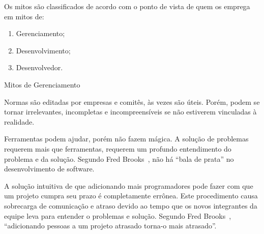 \begin{frame}{\inserttitle}

Os mitos são classificados de acordo com o ponto de vista de quem 
os emprega em mitos de:

  \begin{enumerate}[<+-| alert@+>]
  \item Gerenciamento;
  \item Desenvolvimento;
  \item Desenvolvedor.
  \end{enumerate}

\end{frame}


\begin{frame}{Mitos de Gerenciamento}
\small
\begin{description}[<+-| alert@+>]
\item[Normas e padrões] Normas são editadas por empresas e comitês, às
  vezes são úteis. Porém, podem se tornar irrelevantes, incompletas e
  incompreensíveis se não estiverem vinculadas à realidade.
\item[Ferramentas] Ferramentas podem ajudar, porém não fazem mágica. A
  solução de problemas requerem mais que ferramentas, requerem um
  profundo entendimento do problema e da solução. Segundo Fred
  Brooks~\cite{brooks1975}, não há ``bala de prata'' no
  desenvolvimento de software.
\item[Mais programadores:] A solução intuitiva de que adicionando mais
  programadores pode fazer com que um projeto cumpra seu prazo é
  completamente errônea. Este procedimento causa sobrecarga de
  comunicação e atraso devido ao tempo que os novos integrantes da
  equipe leva para entender o problemas e solução. Segundo Fred
  Brooks~\cite{brooks1975}, ``adicionando pessoas a um projeto
  atrasado torna-o mais atrasado''.
\end{description}

\end{frame}


